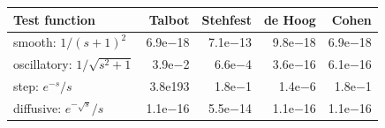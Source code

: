 \begin{tabular}{@{}lrrrr@{}}\toprule
Test function & Talbot & Stehfest & de Hoog & Cohen\\\midrule
smooth: $1/(s+1)^2$ & 6.9e$-$18 & 7.1e$-$13 & 9.8e$-$18 & 6.9e$-$18\\
oscillatory: $1/\sqrt{s^2+1}$ & 3.9e$-$2 & 6.6e$-$4 & 3.6e$-$16 & 6.1e$-$16\\
step: $e^{-s}/s$ & 3.8e193 & 1.8e$-$1 & 1.4e$-$6 & 1.8e$-$1\\
diffusive: $e^{-\sqrt s}/s$ & 1.1e$-$16 & 5.5e$-$14 & 1.1e$-$16 & 1.1e$-$16\\
\bottomrule\end{tabular}